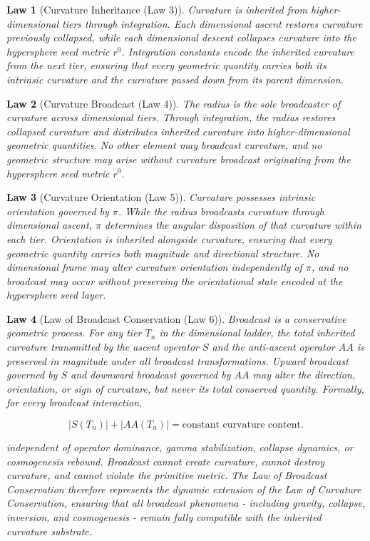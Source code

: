 \documentclass[final,onefignum,onetabnum]{siamart}
\newtheorem{law}{Law}
\begin{document}
\begin{law}[Curvature Inheritance (Law 3)]
Curvature is inherited from higher-dimensional tiers through integration. Each dimensional ascent restores curvature previously collapsed, while each dimensional descent collapses curvature into the hypersphere seed metric $r^0$. Integration constants encode the inherited curvature from the next tier, ensuring that every geometric quantity carries both its intrinsic curvature and the curvature passed down from its parent dimension.
\end{law}

\begin{law}[Curvature Broadcast (Law 4)]
The radius is the sole broadcaster of curvature across dimensional tiers. Through integration, the radius restores collapsed curvature and distributes inherited curvature into higher-dimensional geometric quantities. No other element may broadcast curvature, and no geometric structure may arise without curvature broadcast originating from the hypersphere seed metric $r^0$.
\end{law}

\begin{law}[Curvature Orientation (Law 5)]
Curvature possesses intrinsic orientation governed by $\pi$. While the radius broadcasts curvature through dimensional ascent, $\pi$ determines the angular disposition of that curvature within each tier. Orientation is inherited alongside curvature, ensuring that every geometric quantity carries both magnitude and directional structure. No dimensional frame may alter curvature orientation independently of $\pi$, and no broadcast may occur without preserving the orientational state encoded at the hypersphere seed layer.
\end{law}

\begin{law}[Law of Broadcast Conservation (Law 6)]
Broadcast is a conservative geometric process. For any tier $T_n$ in the dimensional ladder, the total inherited curvature transmitted by the ascent operator $S$ and the anti-ascent operator $AA$ is preserved in magnitude under all broadcast transformations. Upward broadcast governed by $S$ and downward broadcast governed by $AA$ may alter the direction, orientation, or sign of curvature, but never its total conserved quantity. Formally, for every broadcast interaction,


\[
\lvert S(T_n)\rvert + \lvert AA(T_n)\rvert = \text{constant curvature content}.
\]


independent of operator dominance, gamma stabilization, collapse dynamics, or cosmogenesis rebound. Broadcast cannot create curvature, cannot destroy curvature, and cannot violate the primitive metric. The Law of Broadcast Conservation therefore represents the dynamic extension of the Law of Curvature Conservation, ensuring that all broadcast phenomena - including gravity, collapse, inversion, and cosmogenesis - remain fully compatible with the inherited curvature substrate.
\end{law}
\end{document}
